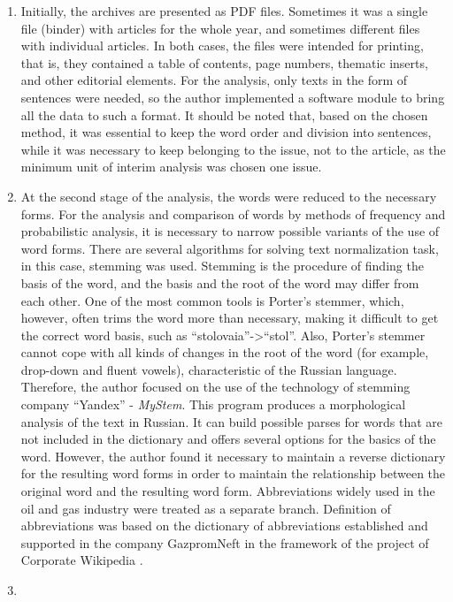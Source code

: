 \documentclass[12pt]{report}
\theoremstyle{definition}
\begin{document}
\begin{enumerate}
	\item
	Initially, the archives are presented as PDF files. 
	Sometimes it was a single file (binder) with articles for the whole year, and sometimes different files with individual articles. 
	In both cases, the files were intended for printing, that is, they contained a table of contents, page numbers, thematic inserts, and other editorial elements. 
	For the analysis, only texts in the form of sentences were needed, so the author implemented a software module to bring all the data to such a format. 
	It should be noted that, based on the chosen method, it was essential to keep the word order and division into sentences, while it was necessary to keep belonging to the issue, not to the article, as the minimum unit of interim analysis was chosen one issue.
	\item 
	At the second stage of the analysis, the words were reduced to the necessary forms. 
	For the analysis and comparison of words by methods of frequency and probabilistic analysis, it is necessary to narrow possible variants of the use of word forms. 
	There are several algorithms for solving text normalization task, in this case, stemming was used. 
	Stemming is the procedure of finding the basis of the word, and the basis and the root of the word may differ from each other.  
	One of the most common tools is Porter's stemmer, which, however, often trims the word more than necessary, making it difficult to get the correct word basis, such as ``stolovaia''->``stol''.
	Also, Porter's stemmer  cannot cope with all kinds of changes in the root of the word (for example, drop-down and fluent vowels), characteristic of the Russian language. 
	Therefore, the author focused on the use of the technology of stemming company ``Yandex'' - \textit{MyStem}. 
	This program produces a morphological analysis of the text in Russian. 
	It can build possible parses for words that are not included in the dictionary and offers several options for the basics of the word. 
	However, the author found it necessary to maintain a reverse dictionary for the resulting word forms in order to maintain the relationship between the original word and the resulting word form. 
	Abbreviations widely used in the oil and gas industry were treated as a separate branch. 
	Definition of abbreviations was based on the dictionary of abbreviations established and supported in the company GazpromNeft in the framework of the project of Corporate Wikipedia \cite{khasanov2016corporate}.
	\item 

\end{enumerate}
\end{document}

